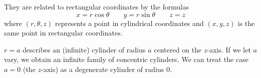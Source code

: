 They are related to rectangular coordinates by the formulas
\[
	x=r\cos\theta\qquad
	y=r\sin\theta\qquad
	z=z
\]
where $(r,\theta,z)$ represents a point in cylindrical coordinates and $(x,y,z)$ is the same point in rectangular
coordinates.



\begin{example}  $r = a$ describes an (infinite) cylinder
of radius $a$ centered on the $z$-axis.  If we let $a$ vary, we
obtain an infinite family of concentric cylinders.  We can treat
the case $a = 0$ (the $z$-axis) as a degenerate cylinder of
radius 0.

	\begin{center}
	\end{center}
\end{example}

